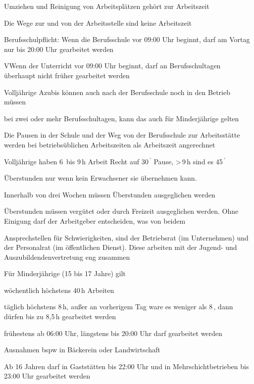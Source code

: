 \begin{myitemize}
    \item Umziehen und Reinigung von Arbeitsplätzen gehört zur Arbeitszeit
    \item Die Wege zur und von der Arbeitsstelle sind keine Arbeitszeit
    \item Berufsschulpflicht: Wenn die Berufsschule vor 09:00 Uhr beginnt, darf am Vortag nur bis 20:00 Uhr gearbeitet werden
    \item VWenn der Unterricht vor 09:00 Uhr beginnt, darf an Berufsschultagen überhaupt nicht früher gearbeitet werden
    \item Volljährige Azubis können auch nach der Berufsschule noch in den Betrieb müssen
    \item bei zwei oder mehr Berufsschultagen, kann das auch für Minderjährige gelten
    \item Die Pausen in der Schule und der Weg von der Berufsschule zur Arbeitsstätte werden bei betriebsüblichen Arbeitszeiten als Arbeitszeit angerechnet
    \item Volljährige haben 6\, bis 9\,h Arbeit Recht auf 30$\,^{\prime}$ Pause, >\,9\,h sind es 45$\,^{\prime}$
    \item Überstunden nur wenn kein Erwachsener sie übernehmen kann.
    \item Innerhalb von drei Wochen müssen Überstunden ausgeglichen werden
    \item Überstunden müssen vergütet oder durch Freizeit ausgeglichen werden. Ohne Einigung darf der Arbeitgeber entscheiden, was von beidem
    \item Ansprechstellen für Schwierigkeiten, sind der Betriebsrat (im Unternehmen) und der Personalrat (im öffentlichen Dienst). Diese arbeiten mit der Jugend- und Auszubildendenvertretung eng zusammen    
    \item Für Minderjährige (15 bis 17 Jahre) gilt
    \begin{myitemize}
        \item wöchentlich höchstens 40\,h Arbeiten
        \item täglich höchstens 8\,h, außer an vorherigem Tag ware es weniger als 8\,, dann dürfen bis zu 8,5\,h gearbeitet werden
        \item frühestens ab 06:00 Uhr, längstens bis 20:00 Uhr darf gearbeitet werden 
        \item Ausnahmen \gls{bspw} in Bäckerein oder Landwirtschaft
        \item Ab 16 Jahren darf in Gaststätten bis 22:00 Uhr und in Mehrschichtbetrieben bis 23:00 Uhr gearbeitet werden

\end{myitemize}
\end{myitemize}
